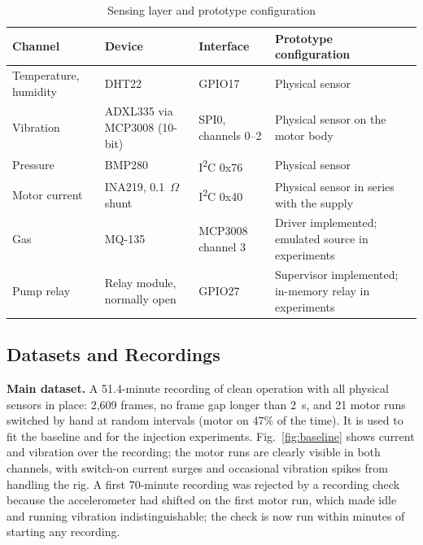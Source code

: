 \documentclass[11pt,a4paper]{article}
\begin{document}
\begin{table}[H]
\centering
\caption{Sensing layer and prototype configuration}
\label{tab:rig}
\small
\begin{tabularx}{\textwidth}{@{}P{2.4cm} P{3.6cm} P{3.0cm} X@{}}
\toprule
\textbf{Channel} & \textbf{Device} & \textbf{Interface} & \textbf{Prototype configuration} \\
\midrule
Temperature, humidity & DHT22 & GPIO17 & Physical sensor \\
Vibration & ADXL335 via MCP3008 (10-bit) & SPI0, channels 0--2 & Physical sensor on the motor body \\
Pressure & BMP280 & I\textsuperscript{2}C 0x76 & Physical sensor \\
Motor current & INA219, 0.1~$\Omega$ shunt & I\textsuperscript{2}C 0x40 & Physical sensor in series with the supply \\
Gas & MQ-135 & MCP3008 channel 3 & Driver implemented; emulated source in experiments \\
Pump relay & Relay module, normally open & GPIO27 & Supervisor implemented; in-memory relay in experiments \\
\bottomrule
\end{tabularx}
\end{table}

\subsection{Datasets and Recordings}

\textbf{Main dataset.} A 51.4-minute recording of clean operation with all physical sensors in place: 2,609 frames, no frame gap longer than 2~s, and 21 motor runs switched by hand at random intervals (motor on 47\% of the time). It is used to fit the baseline and for the injection experiments. Fig.~\ref{fig:baseline} shows current and vibration over the recording; the motor runs are clearly visible in both channels, with switch-on current surges and occasional vibration spikes from handling the rig. A first 70-minute recording was rejected by a recording check because the accelerometer had shifted on the first motor run, which made idle and running vibration indistinguishable; the check is now run within minutes of starting any recording.
\end{document}
